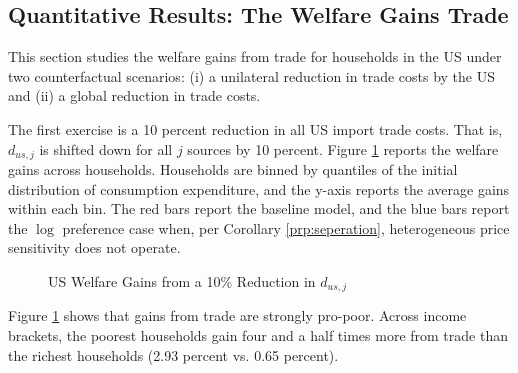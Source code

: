 \documentclass[12pt,pdftex]{article}
\begin{document}
\begin{onehalfspacing}
\subsection{Quantitative Results: The Welfare Gains Trade}

This section studies the welfare gains from trade for households in the US under two counterfactual scenarios: (i) a unilateral reduction in trade costs by the US and (ii) a global reduction in trade costs.

The first exercise is a 10 percent reduction in all US import trade costs. That is, $d_{us,j}$ is shifted down for all $j$ sources by 10 percent. Figure \ref{fig:welfare-households} reports the welfare gains across households. Households are binned by quantiles of the initial distribution of consumption expenditure, and the y-axis reports the average gains within each bin. The red bars report the baseline model, and the blue bars report the $\log$ preference case when, per Corollary \ref{prp:seperation}, heterogeneous price sensitivity does not operate.

\begin{figure}[!t]
\caption{US Welfare Gains from a 10\% Reduction in $d_{us,j}$ }\label{fig:welfare-households}
\end{figure}

Figure \ref{fig:welfare-households} shows that gains from trade are strongly pro-poor. Across income brackets, the poorest households gain four and a half times more from trade than the richest households (2.93 percent vs. 0.65 percent).


\end{onehalfspacing}
\end{document}
